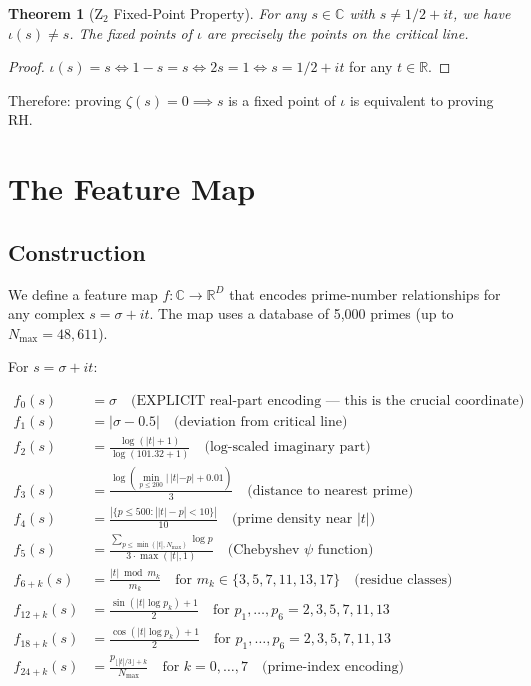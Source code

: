 \documentclass[11pt]{article}
\newtheorem{theorem}{Theorem}[section]
\begin{document}
\begin{theorem}[Z$_2$ Fixed-Point Property]
For any $s \in \mathbb{C}$ with $s \neq 1/2 + it$, we have $\iota(s) \neq s$. The fixed points of $\iota$ are precisely the points on the critical line.
\end{theorem}

\begin{proof}
$\iota(s) = s \iff 1 - s = s \iff 2s = 1 \iff s = 1/2 + it$ for any $t \in \mathbb{R}$.
\end{proof}

Therefore: proving $\zeta(s) = 0 \implies s$ is a fixed point of $\iota$ is equivalent to proving RH.

\newpage
\section{The Feature Map}
\label{sec:feature}

\subsection{Construction}

We define a feature map $f: \mathbb{C} \to \mathbb{R}^D$ that encodes prime-number relationships for any complex $s = \sigma + it$. The map uses a database of 5,000 primes (up to $N_{\max} = 48,611$).

For $s = \sigma + it$:

\begin{align}
f_0(s) &= \sigma \quad \text{(EXPLICIT real-part encoding --- this is the crucial coordinate)}\\
f_1(s) &= |\sigma - 0.5| \quad \text{(deviation from critical line)}\\
f_2(s) &= \frac{\log(|t| + 1)}{\log(101.32 + 1)} \quad \text{(log-scaled imaginary part)}\\
f_3(s) &= \frac{\log(\min_{p \le 200} |\,|t| - p| + 0.01)}{3} \quad \text{(distance to nearest prime)}\\
f_4(s) &= \frac{|\{p \le 500 : ||t| - p| < 10\}|}{10} \quad \text{(prime density near $|t|$)}\\
f_5(s) &= \frac{\sum_{p \le \min(|t|, N_{\max})} \log p}{3 \cdot \max(|t|, 1)} \quad \text{(Chebyshev $\psi$ function)}\\
f_{6+k}(s) &= \frac{|t| \bmod m_k}{m_k} \quad \text{for } m_k \in \{3,5,7,11,13,17\} \quad \text{(residue classes)}\\
f_{12+k}(s) &= \frac{\sin(|t| \log p_k) + 1}{2} \quad \text{for } p_1,\ldots,p_6 = 2,3,5,7,11,13\\
f_{18+k}(s) &= \frac{\cos(|t| \log p_k) + 1}{2} \quad \text{for } p_1,\ldots,p_6 = 2,3,5,7,11,13\\
f_{24+k}(s) &= \frac{p_{\lfloor |t|/3 \rfloor + k}}{N_{\max}} \quad \text{for } k = 0,\ldots,7 \quad \text{(prime-index encoding)}
\end{align}
\end{document}
